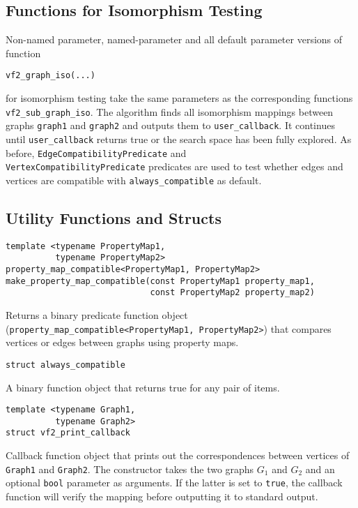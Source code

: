 \documentclass[12pt]{article}
\begin{document}
\subsection{Functions for Isomorphism Testing}

Non-named parameter, named-parameter and all default parameter versions of 
function
\begin{lstlisting}
vf2_graph_iso(...)
\end{lstlisting}

for isomorphism testing take the same parameters as the corresponding
functions \verb+vf2_sub_graph_iso+. The algorithm finds all isomorphism
mappings between graphs \verb+graph1+ and \verb+graph2+ and outputs them to
\verb+user_callback+. It continues until \verb+user_callback+ returns true
or the search space has been fully explored. As before,
\verb+EdgeCompatibilityPredicate+ and\\
\verb+VertexCompatibilityPredicate+
predicates are used to test whether edges and vertices are compatible with
\verb+always_compatible+ as default.

\subsection{Utility Functions and Structs}

\begin{lstlisting}
template <typename PropertyMap1,
          typename PropertyMap2>
property_map_compatible<PropertyMap1, PropertyMap2>
make_property_map_compatible(const PropertyMap1 property_map1,
                             const PropertyMap2 property_map2) 
\end{lstlisting}
Returns a binary predicate function object \\
(\verb+property_map_compatible<PropertyMap1, PropertyMap2>+) that compares
vertices or edges between graphs using property maps. 


\begin{lstlisting}
struct always_compatible
\end{lstlisting}
A binary function object that returns true for any pair of items. 


\begin{lstlisting}
template <typename Graph1,
          typename Graph2>
struct vf2_print_callback
\end{lstlisting}
Callback function object that prints out the correspondences between vertices
of \verb+Graph1+ and \verb+Graph2+. The constructor takes the two graphs $G_1$
and $G_2$ and an optional \verb+bool+ parameter as arguments. If the latter is
set to \verb+true+, the callback function will verify the mapping before outputting
it to standard output.
\end{document}
